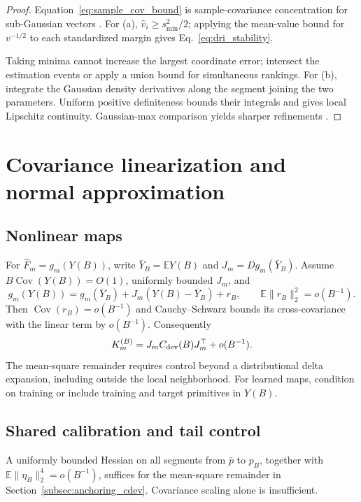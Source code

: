\documentclass[a4paper,onecolumn,unpublished,nopdfoutputerror]{quantumarticle}
\theoremstyle{plain}
\theoremstyle{definition}
\newcommand{\E}{\mathbb{E}}
\newcommand{\Cov}{\operatorname{Cov}}
\newcommand{\1}{\mathbf{1}}
\begin{document}
\begin{proof}
Equation~\eqref{eq:sample_cov_bound} is sample-covariance concentration for sub-Gaussian vectors \cite{Vershynin2018,KoltchinskiiLounici2017}. For (a), $\widehat v_i\ge s_{\min}^2/2$; applying the mean-value bound for $v^{-1/2}$ to each standardized margin gives Eq.~\eqref{eq:dri_stability}.

Taking minima cannot increase the largest coordinate error; intersect the estimation events or apply a union bound for simultaneous rankings. For (b), integrate the Gaussian density derivatives along the segment joining the two parameters. Uniform positive definiteness bounds their integrals and gives local Lipschitz continuity. Gaussian-max comparison yields sharper refinements \cite{Chernozhukov2013}.
\end{proof}

\section{Covariance linearization and normal approximation}
\label{app:covariance_clt}

\subsection{Nonlinear maps}

For $\widehat F_m=g_m(Y(B))$, write $\bar Y_B=\E Y(B)$ and $J_m=Dg_m(\bar Y_B)$. Assume $B\Cov(Y(B))=O(1)$, uniformly bounded $J_m$, and
\[
g_m(Y(B))=g_m(\bar Y_B)+J_m(Y(B)-\bar Y_B)+r_B,
\qquad \E\|r_B\|_2^2=o(B^{-1}).
\]
Then $\Cov(r_B)=o(B^{-1})$ and Cauchy--Schwarz bounds its cross-covariance with the linear term by $o(B^{-1})$. Consequently
\begin{equation}
K_m^{(B)}=J_mC_{\rm dev}(B)J_m^\top+o(B^{-1}).
\end{equation}
The mean-square remainder requires control beyond a distributional delta expansion, including outside the local neighborhood. For learned maps, condition on training or include training and target primitives in $Y(B)$.

\subsection{Shared calibration and tail control}
\label{app:calibration_covariance}
A uniformly bounded Hessian on all segments from $\bar p$ to $p_B$, together with $\E\|\eta_B\|_2^4=o(B^{-1})$, suffices for the mean-square remainder in Section~\ref{subsec:anchoring_cdev}. Covariance scaling alone is insufficient.
\end{document}
